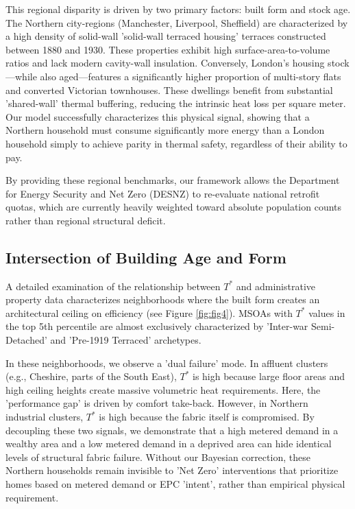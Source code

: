 \documentclass[11pt, a4paper, twocolumn]{article}
\begin{document}
This regional disparity is driven by two primary factors: built form and stock age. The Northern city-regions (Manchester, Liverpool, Sheffield) are characterized by a high density of solid-wall 'solid-wall terraced housing' terraces constructed between 1880 and 1930. These properties exhibit high surface-area-to-volume ratios and lack modern cavity-wall insulation. Conversely, London’s housing stock—while also aged—features a significantly higher proportion of multi-story flats and converted Victorian townhouses. These dwellings benefit from substantial 'shared-wall' thermal buffering, reducing the intrinsic heat loss per square meter. Our model successfully characterizes this physical signal, showing that a Northern household must consume significantly more energy than a London household simply to achieve parity in thermal safety, regardless of their ability to pay.

By providing these regional benchmarks, our framework allows the Department for Energy Security and Net Zero (DESNZ) to re-evaluate national retrofit quotas, which are currently heavily weighted toward absolute population counts rather than regional structural deficit.

\subsection{Intersection of Building Age and Form}\label{intersection-of-building-age-and-form}

A detailed examination of the relationship between $T^*$ and administrative property data characterizes neighborhoods where the built form creates an architectural ceiling on efficiency (see Figure \ref{fig:fig4}).
 MSOAs with $T^*$ values in the top 5th percentile are almost exclusively characterized by 'Inter-war Semi-Detached' and 'Pre-1919 Terraced' archetypes. 

In these neighborhoods, we observe a 'dual failure' mode. In affluent clusters (e.g., Cheshire, parts of the South East), $T^*$ is high because large floor areas and high ceiling heights create massive volumetric heat requirements. Here, the 'performance gap' is driven by comfort take-back. However, in Northern industrial clusters, $T^*$ is high because the fabric itself is compromised. By decoupling these two signals, we demonstrate that a high metered demand in a wealthy area and a low metered demand in a deprived area can hide identical levels of structural fabric failure. Without our Bayesian correction, these Northern households remain invisible to 'Net Zero' interventions that prioritize homes based on metered demand or EPC 'intent', rather than empirical physical requirement.
\end{document}
